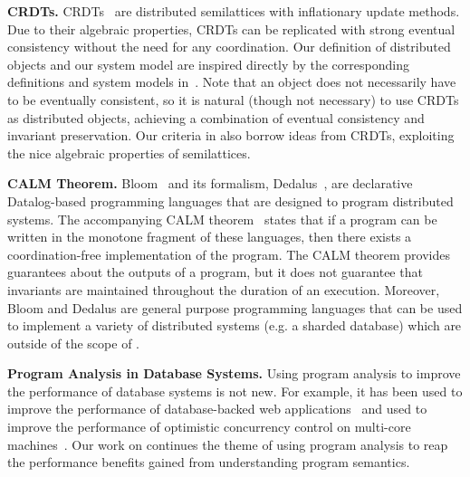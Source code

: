 \textbf{CRDTs.}
CRDTs~\cite{shapiro2011conflict, shapiro2011comprehensive} are distributed
semilattices with inflationary update methods. Due to their algebraic
properties, CRDTs can be replicated with strong eventual consistency without
the need for any coordination. Our definition of distributed objects and our
\invariantconfluence{} system model are inspired directly by the corresponding
definitions and system models in~\cite{shapiro2011conflict}. Note that an
\invariantconfluent{} object does not necessarily have to be eventually
consistent, so it is natural (though not necessary) to use CRDTs as
\invariantconfluent{} distributed objects, achieving a combination of eventual
consistency and invariant preservation. Our criteria in
 also borrow ideas from CRDTs, exploiting the nice
algebraic properties of semilattices.

\textbf{CALM Theorem.}
Bloom~\cite{alvaro2010boom, alvaro2011consistency, conway2012logic} and its
formalism, Dedalus~\cite{alvaro2011dedalus, alvaro2013declarative}, are
declarative Datalog-based programming languages that are designed to program
distributed systems. The accompanying CALM
theorem~\cite{hellerstein2010declarative, ameloot2013relational} states that if
a program can be written in the monotone fragment of these languages, then
there exists a coordination-free implementation of the program.
The CALM theorem provides guarantees about the outputs of a program, but it
does not guarantee that invariants are maintained throughout the duration of an
execution. Moreover, Bloom and Dedalus are general purpose programming
languages that can be used to implement a variety of distributed systems (e.g.
a sharded database) which are outside of the scope of \invariantconfluence{}.

\textbf{Program Analysis in Database Systems.}
Using program analysis to improve the performance of database systems is not
new. For example, it has been used to improve the performance of
database-backed web applications~\cite{cheung2014using, wu2016transaction,
ramachandra2012program} and used to improve the performance of optimistic
concurrency control on multi-core machines~\cite{wu2016transaction}. Our work
on \invariantconfluence{} continues the theme of using program analysis to reap
the performance benefits gained from understanding program semantics.

